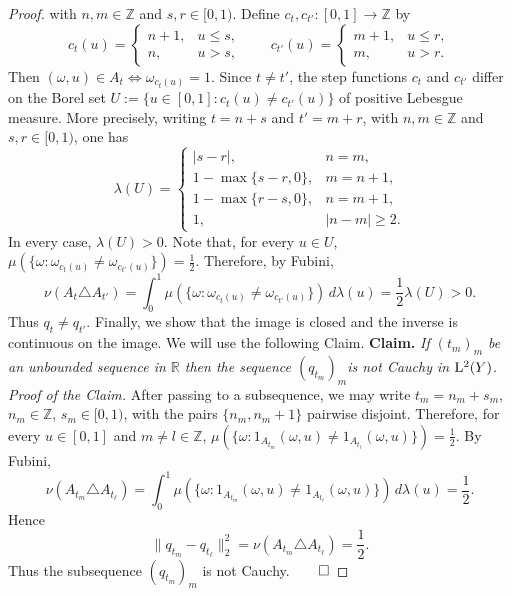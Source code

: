 \documentclass[12pt]{amsart} %
\theoremstyle{plain}
\theoremstyle{definition}
\newcommand{\Z}{\mathbb{Z}}
\begin{document}
\begin{proof}
with \(n,m\in\mathbb Z\) and \(s,r\in[0,1)\). Define $c_t,c_{t'}:[0,1]\to\Z$ by
\[
        c_t(u)=
        \begin{cases}
        n+1, & u\leq s,\\
        n, & u>s,
        \end{cases}
        \qquad
        c_{t'}(u)=
        \begin{cases}
        m+1, & u\leq r,\\
        m, & u>r.
        \end{cases}
\]
Then $(\omega,u)\in A_t\Leftrightarrow\omega_{c_t(u)}=1$. Since \(t\neq t'\), the step functions \(c_t\) and \(c_{t'}\) differ on the Borel set $U:=\{u\in[0,1]:c_t(u)\neq c_{t'}(u)\}$
of positive Lebesgue measure. More precisely, writing
$t=n+s$ and $t'=m+r$, with $n,m\in\mathbb Z$ and $s,r\in[0,1)$, one has
$$
\lambda(U)=
\begin{cases}
|s-r|, & n=m,\\
1-\max\{s-r,0\}, & m=n+1,\\
1-\max\{r-s,0\}, & n=m+1,\\
1, & |n-m|\geq 2.
\end{cases}
$$
In every case, $\lambda(U)>0$. Note that, for every \(u\in U\), $ \mu(\{\omega:\omega_{c_t(u)}\neq\omega_{c_{t'}(u)}\})
        =
        \frac12$. Therefore, by Fubini,
\[
        \nu(A_t\triangle A_{t'})
        =
        \int_0^1
        \mu(\{\omega:\omega_{c_t(u)}\neq\omega_{c_{t'}(u)}\})\,d\lambda(u)
       =
        \frac12\lambda(U)>0.
\]
Thus \(q_t\neq q_{t'}\).
\medskip
\noindent Finally, we show that the image is closed and the inverse is continuous on the image. We will use the following Claim.
\medskip
\noindent\textbf{Claim.} \textit{If \((t_m)_m\) be an unbounded sequence in \(\mathbb R\) then the sequence $(q_{t_m})_m$is not Cauchy in \({\rm L}^2(Y)\).}
\medskip
\noindent\textit{Proof of the Claim.} After passing to a subsequence, we may write $t_m=n_m+s_m$, $n_m\in\mathbb Z$, $s_m\in[0,1)$, with the pairs $\{n_m,n_m+1\}$ pairwise disjoint. Therefore, for every \(u\in[0,1]\) and $m\neq l\in\Z$, $\mu(\{\omega:1_{A_{t_m}}(\omega,u)\neq 1_{A_{t_\ell}}(\omega,u)\})=\frac12$. By Fubini,
\[
        \nu(A_{t_m}\triangle A_{t_\ell})
        =
        \int_0^1
        \mu(\{\omega:1_{A_{t_m}}(\omega,u)\neq 1_{A_{t_\ell}}(\omega,u)\})
        \,d\lambda(u)
        =
        \frac12.
\]
Hence
\[
        \|q_{t_m}-q_{t_\ell}\|_2^2
        =
        \nu(A_{t_m}\triangle A_{t_\ell})
        =
        \frac12.
\]
Thus the subsequence \((q_{t_m})_m\) is not Cauchy.$\hfill\qed$
\medskip

\end{proof}
\end{document}
